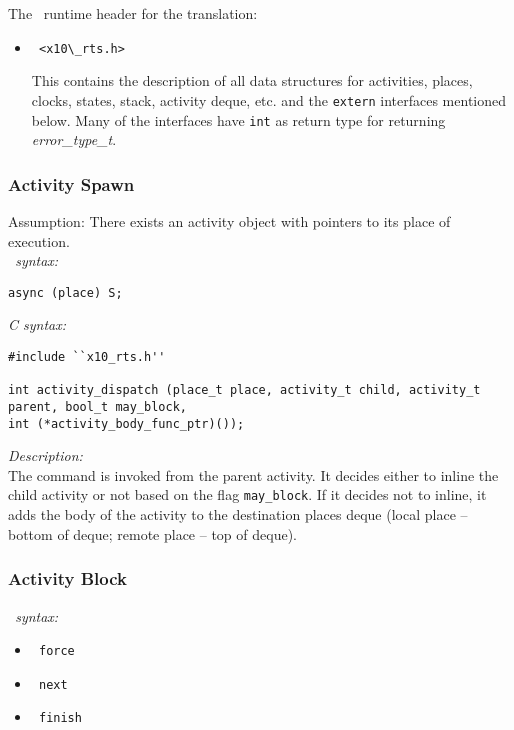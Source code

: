 The \Xten\ runtime header for the translation:
\begin{itemize}
\item \begin{verbatim} <x10\_rts.h> \end{verbatim} 
This contains the description of all data structures for activities, places,
clocks, states, stack, activity deque, etc. and the {\tt extern} interfaces
mentioned below. Many of the interfaces have {\tt int} as return type for returning 
{\it error\_type\_t}.
\end{itemize}

\subsubsection{Activity Spawn}
Assumption: There exists an activity object with pointers to its place of execution.
\\
{\it \Xten\ syntax:}
\\
\begin{verbatim}
async (place) S;
\end{verbatim}
{\it C syntax:}
\begin{verbatim}
#include ``x10_rts.h''

int activity_dispatch (place_t place, activity_t child, activity_t parent, bool_t may_block, 
int (*activity_body_func_ptr)());
\end{verbatim}

{\it Description:} 
\\
The command is invoked from the parent activity. It decides either to inline
the child activity or not based on the flag {\tt may\_block}. If it decides not
to inline, it adds the body of the activity to the destination places deque
(local place -- bottom of deque; remote place -- top of deque).

\subsubsection{Activity Block}
{\it \Xten\ syntax:}
\begin{itemize}		 
\item \begin{verbatim} force \end{verbatim}
\item \begin{verbatim} next \end{verbatim}	
\item \begin{verbatim} finish \end{verbatim}
\end{itemize}

